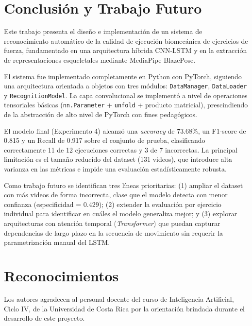 \documentclass[conference]{IEEEtran}
\begin{document}
\section{Conclusión y Trabajo Futuro}
\label{sec:conclusion}

Este trabajo presenta el diseño e implementación de un sistema
de reconocimiento automático de la calidad de ejecución
biomecánica de ejercicios de fuerza, fundamentado en una
arquitectura híbrida CNN-LSTM y en la extracción de
representaciones esqueletales mediante MediaPipe BlazePose.

El sistema fue implementado completamente en Python con PyTorch,
siguiendo una arquitectura orientada a objetos con tres módulos:
\texttt{DataManager}, \texttt{DataLoader} y
\texttt{RecognitionModel}. La capa convolucional se implementó
a nivel de operaciones tensoriales básicas (\texttt{nn.Parameter}
+ \texttt{unfold} + producto matricial), prescindiendo de la
abstracción de alto nivel de PyTorch con fines pedagógicos.

El modelo final (Experimento 4) alcanzó una \textit{accuracy}
de 73.68\%, un F1-score de 0.815 y un Recall de 0.917 sobre
el conjunto de prueba, clasificando correctamente 11 de 12
ejecuciones correctas y 3 de 7 incorrectas. La principal
limitación es el tamaño reducido del dataset (131 videos),
que introduce alta varianza en las métricas e impide una
evaluación estadísticamente robusta.

Como trabajo futuro se identifican tres líneas prioritarias:
(1) ampliar el dataset con más videos de forma incorrecta,
clase que el modelo detecta con menor confianza (especificidad
= 0.429); (2) extender la evaluación por ejercicio individual
para identificar en cuáles el modelo generaliza mejor; y (3)
explorar arquitecturas con atención temporal (\textit{Transformer})
que puedan capturar dependencias de largo plazo en la secuencia
de movimiento sin requerir la parametrización manual del LSTM.

\section*{Reconocimientos}

Los autores agradecen al personal docente del curso de
Inteligencia Artificial, Ciclo IV, de la Universidad de Costa
Rica por la orientación brindada durante el desarrollo de este
proyecto.



\end{document}
